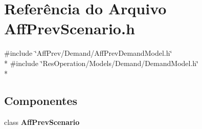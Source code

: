 \section{Referência do Arquivo Aff\+Prev\+Scenario.\+h}
\label{_aff_prev_scenario_8h}
{\ttfamily \#include \char`\"{}Aff\+Prev/\+Demand/\+Aff\+Prev\+Demand\+Model.\+h\char`\"{}}\\*
{\ttfamily \#include \char`\"{}Res\+Operation/\+Models/\+Demand/\+Demand\+Model.\+h\char`\"{}}\\*
\subsection*{Componentes}
\begin{DoxyCompactItemize}
\item 
class {\bf Aff\+Prev\+Scenario}
\end{DoxyCompactItemize}
